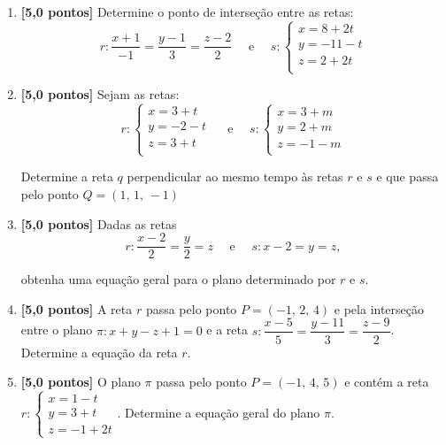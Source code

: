 \documentclass[12pt,a4paper]{article}
\begin{document}
\begin{enumerate}

  \item \textbf{[5,0 pontos]} Determine o ponto de interseção entre as retas:
 $$
   r: \dfrac{x + 1}{-1} = \dfrac{y - 1}{3} = \dfrac{z - 2}{2}
   \quad \textrm{ e }\quad
   s:\begin{cases}
     x = 8 + 2t\\
     y = -11 - t\\
     z = 2 + 2t\\
   \end{cases}
 $$ 
  
  \item \textbf{[5,0 pontos]} Sejam as retas:
 $$
   r:\begin{cases}
     x = 3 + t\\
     y = -2 - t\\
     z = 3 + t\\
   \end{cases}
   \quad \textrm{ e }\quad
   s:\begin{cases}
     x = 3 + m\\
     y = 2 + m\\
     z = -1 - m\\
   \end{cases}
 $$ 
 
 Determine a reta $q$ perpendicular ao mesmo tempo às retas $r$ e $s$ e que
 passa pelo ponto $Q = (1,\,1,\,-1)$

  \item \textbf{[5,0 pontos]} Dadas as retas
 $$
   r: \dfrac{x-2}{2} = \dfrac{y}{2} = z \quad \textrm{ e }\quad s: x - 2 = y = z,
 $$

 obtenha uma equação geral para o plano determinado por $r$ e $s$.
    
  \item \textbf{[5,0 pontos]} A reta $r$ passa pelo ponto $P = (-1,\, 2,\, 4)$
  e pela interseção entre o plano $\pi : x + y - z + 1 = 0$ e a reta 
  $s : \dfrac{x - 5}{5} = \dfrac{y - 11}{3} = \dfrac{z - 9}{2}$. Determine 
  a equação da reta $r$.

  \item \textbf{[5,0 pontos]} O plano $\pi$ passa pelo ponto $P = (-1,\, 4,\, 5)$ e 
  contém a reta $r : \begin{cases} x = 1 - t \\ y = 3 + t \\ z = -1 + 2t\end{cases}$. 
  Determine a equação geral do plano $\pi$.
    
 
\end{enumerate}
\end{document}
